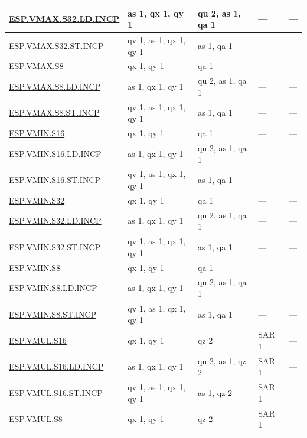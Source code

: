 \begin{longtable}[c]{|l|m{2.5cm}|m{2.5cm}|m{2.5cm}|m{2.5cm}|}
    \hyperref[instruction:ESPVMAXS32LDINCP]{ESP.VMAX.S32.LD.INCP} & as 1, qx 1, qy 1 & qu 2, as 1, qa 1 & — & — \\\hline
    \hyperref[instruction:ESPVMAXS32STINCP]{ESP.VMAX.S32.ST.INCP} & qv 1, as 1, qx 1, qy 1 & as 1, qa 1 & — & — \\\hline
    \hyperref[instruction:ESPVMAXS8]{ESP.VMAX.S8} & qx 1, qy 1 & qa 1 & — & — \\\hline
    \hyperref[instruction:ESPVMAXS8LDINCP]{ESP.VMAX.S8.LD.INCP} & as 1, qx 1, qy 1 & qu 2, as 1, qa 1 & — & — \\\hline
    \hyperref[instruction:ESPVMAXS8STINCP]{ESP.VMAX.S8.ST.INCP} & qv 1, as 1, qx 1, qy 1 & as 1, qa 1 & — & — \\\hline
    \hyperref[instruction:ESPVMINS16]{ESP.VMIN.S16} & qx 1, qy 1 & qa 1 & — & — \\\hline
    \hyperref[instruction:ESPVMINS16LDINCP]{ESP.VMIN.S16.LD.INCP} & as 1, qx 1, qy 1 & qu 2, as 1, qa 1 & — & — \\\hline
    \hyperref[instruction:ESPVMINS16STINCP]{ESP.VMIN.S16.ST.INCP} & qv 1, as 1, qx 1, qy 1 & as 1, qa 1 & — & — \\\hline
    \hyperref[instruction:ESPVMINS32]{ESP.VMIN.S32} & qx 1, qy 1 & qa 1 & — & — \\\hline
    \hyperref[instruction:ESPVMINS32LDINCP]{ESP.VMIN.S32.LD.INCP} & as 1, qx 1, qy 1 & qu 2, as 1, qa 1 & — & — \\\hline
    \hyperref[instruction:ESPVMINS32STINCP]{ESP.VMIN.S32.ST.INCP} & qv 1, as 1, qx 1, qy 1 & as 1, qa 1 & — & — \\\hline
    \hyperref[instruction:ESPVMINS8]{ESP.VMIN.S8} & qx 1, qy 1 & qa 1 & — & — \\\hline
    \hyperref[instruction:ESPVMINS8LDINCP]{ESP.VMIN.S8.LD.INCP} & as 1, qx 1, qy 1 & qu 2, as 1, qa 1 & — & — \\\hline
    \hyperref[instruction:ESPVMINS8STINCP]{ESP.VMIN.S8.ST.INCP} & qv 1, as 1, qx 1, qy 1 & as 1, qa 1 & — & — \\\hline
    \hyperref[instruction:ESPVMULS16]{ESP.VMUL.S16} & qx 1, qy 1 & qz 2 & SAR 1 & — \\\hline
    \hyperref[instruction:ESPVMULS16LDINCP]{ESP.VMUL.S16.LD.INCP} & as 1, qx 1, qy 1 & qu 2, as 1, qz 2 & SAR 1 & — \\\hline
    \hyperref[instruction:ESPVMULS16STINCP]{ESP.VMUL.S16.ST.INCP} & qv 1, as 1, qx 1, qy 1 & as 1, qz 2 & SAR 1 & — \\\hline
    \hyperref[instruction:ESPVMULS8]{ESP.VMUL.S8} & qx 1, qy 1 & qz 2 & SAR 1 & — \\\hline

\end{longtable}
